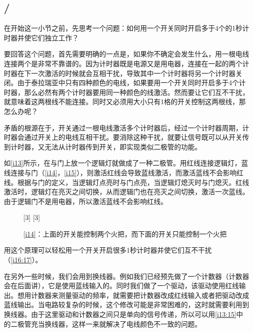\subsection{/}

在开始这一小节之前，先思考一个问题：如何用一个开关同时开启多于4个的1秒计时器并使它们独立工作？

要回答这个问题，首先需要明确的一点是，如果你不确定会发生什么，用一根电线连接两个是非常不靠谱的。因为计时器既是电源又是用电器，连接在一起的两个计时器在下一次激活的时候就会互相干扰，导致其中一个计时器将另一个计时器关闭。由于泰拉瑞亚中只有四种颜色的电线，如果要用一个开关同时开启多于4个计时器，那么必然有两个计时器要用同一种颜色的线激活。然而要让它们互不干扰，就意味着这两根线不能连接。同时又必须用大小只有1格的开关控制这两根线，那怎么办呢？

矛盾的根源在于，开关通过一根电线激活多个计时器后，经过一个计时器周期，计时器会通过开关上的电线互相干扰。要消除这种干扰，就要让信号既可以从开关传到计时器，又无法从计时器传到开关，即实现类似二极管的功能。

如\autoref{i13}所示，在与门上放一个逻辑灯就做成了一种二极管。用红线连接逻辑灯，蓝线连接与门（\autoref{i14}，\autoref{i15}），则激活红线会导致蓝线激活，而激活蓝线不会影响红线。根据与门的定义，当逻辑灯点亮时与门点亮，当逻辑灯熄灭时与门熄灭。红线激活时，逻辑灯在亮灭之间切换，从而逻辑门也在亮灭之间切换，激活一次蓝线。由于逻辑门不是用电器，所以激活蓝线不会影响红线。

\begin{figure}[!ht]
\centering
{}%
[3]%
%
[3]%
\caption{\ref{i14}\protect{}：上面的开关能控制两个火把，而下面的开关只能控制一个火把}
\label{i13:15}
\end{figure}

用这个原理可以轻松用一个开关开启很多1秒计时器并使它们互不干扰（\autoref{i16:17}）。

\begin{figure}[!ht]
\centering
{}%
%
\caption{}
\label{i16:17}
\end{figure}

在另外一些时候，我们会用到换线器。例如我们已经预先做了一个计数器（计数器会在后面讲），它是使用蓝线输入的。同时我们做了一个驱动，该驱动使用红线输出。想用计数器来测量驱动的频率，就需要把计数器改成红线输入或者把驱动改成蓝线输出。当电路较复杂的时候，这个修改可能是非常困难的，这时就需要利用到换线器。由于这里驱动和计数器之间只是单向的信号传递，所以可以用\autoref{i13:15}中的二极管充当换线器，这样一来就解决了电线颜色不一致的问题。

